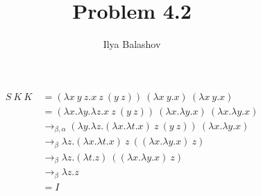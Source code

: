 \documentclass[12pt]{article}
\title{Problem 4.2}
\author{Ilya Balashov}
\date{}
\begin{document}
\maketitle

\begin{align}
S\ K\ K\ & = (\lambda x\ y\ z.x\ z\ (y\ z))\ (\lambda x\ y.x)\ (\lambda x\ y.x) \\
& = (\lambda x.\lambda y.\lambda z.x\ z\ (y\ z))\ (\lambda x.\lambda y.x)\ (\lambda x. \lambda y.x) \\
& \longrightarrow_{\beta, \alpha}  (\lambda y.\lambda z.(\lambda x.\lambda t.x)\ z\ (y\ z))\ (\lambda x.\lambda y.x) \\
& \longrightarrow_\beta \lambda z.(\lambda x.\lambda t.x)\ z\ ((\lambda x.\lambda y.x)\ z) \\
& \longrightarrow_\beta \lambda z.(\lambda t.z)\ ((\lambda x.\lambda y.x)\ z) \\
& \longrightarrow_\beta \lambda z.z \\
& = I
\end{align}
\end{document}
